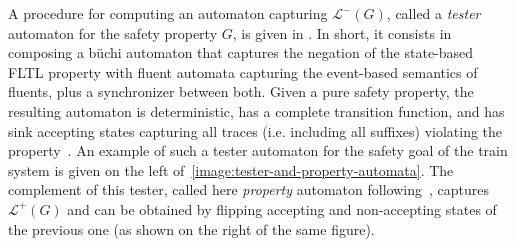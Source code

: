 A procedure for computing an automaton capturing $\mathcal{L}^{-}(G)$, called a \emph{tester} automaton for the safety property $G$, is given in \cite{Giannakopoulou:2003}. In short, it consists in composing a b\"uchi automaton that captures the negation of the state-based FLTL property with fluent automata capturing the event-based semantics of fluents, plus a synchronizer between both. Given a pure safety property, the resulting automaton is deterministic, has a complete transition function, and has sink accepting states capturing all traces (i.e. including all suffixes) violating the property~\cite{Giannakopoulou:2003}. An example of such a tester automaton for the safety goal of the train system is given on the left of~\ref{image:tester-and-property-automata}. The complement of this tester, called here \emph{property} automaton following~\cite{Letier:2005, Letier:2008}, captures $\mathcal{L}^{+}(G)$ and can be obtained by flipping accepting and non-accepting states of the previous one (as shown on the right of the same figure).

